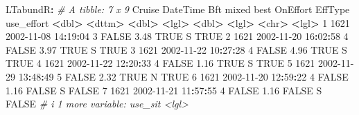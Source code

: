 \documentclass[
]{book}
\newenvironment{Shaded}{\begin{snugshade}}{\end{snugshade}}
\newcommand{\CommentTok}[1]{\textcolor[rgb]{0.56,0.35,0.01}{\textit{#1}}}
\newcommand{\ConstantTok}[1]{\textcolor[rgb]{0.56,0.35,0.01}{#1}}
\newcommand{\DecValTok}[1]{\textcolor[rgb]{0.00,0.00,0.81}{#1}}
\newcommand{\ErrorTok}[1]{\textcolor[rgb]{0.64,0.00,0.00}{\textbf{#1}}}
\newcommand{\FloatTok}[1]{\textcolor[rgb]{0.00,0.00,0.81}{#1}}
\newcommand{\NormalTok}[1]{#1}
\newcommand{\SpecialCharTok}[1]{\textcolor[rgb]{0.81,0.36,0.00}{\textbf{#1}}}
\begin{document}
\begin{Shaded}
\begin{Highlighting}[]
\NormalTok{LTabundR}\SpecialCharTok{:}
\CommentTok{\# A tibble: 7 x 9}
\NormalTok{  Cruise DateTime              Bft mixed  best OnEffort EffType use\_effort}
   \SpecialCharTok{\textless{}}\NormalTok{dbl}\SpecialCharTok{\textgreater{}} \ErrorTok{\textless{}}\NormalTok{dttm}\SpecialCharTok{\textgreater{}}              \ErrorTok{\textless{}}\NormalTok{dbl}\SpecialCharTok{\textgreater{}} \ErrorTok{\textless{}}\NormalTok{lgl}\SpecialCharTok{\textgreater{}} \ErrorTok{\textless{}}\NormalTok{dbl}\SpecialCharTok{\textgreater{}} \ErrorTok{\textless{}}\NormalTok{lgl}\SpecialCharTok{\textgreater{}}    \ErrorTok{\textless{}}\NormalTok{chr}\SpecialCharTok{\textgreater{}}   \ErrorTok{\textless{}}\NormalTok{lgl}\SpecialCharTok{\textgreater{}}     
\DecValTok{1}   \DecValTok{1621} \DecValTok{2002{-}11{-}08} \DecValTok{14}\SpecialCharTok{:}\DecValTok{19}\SpecialCharTok{:}\DecValTok{04}     \DecValTok{3} \ConstantTok{FALSE}  \FloatTok{3.48} \ConstantTok{TRUE}\NormalTok{     S       }\ConstantTok{TRUE}      
\DecValTok{2}   \DecValTok{1621} \DecValTok{2002{-}11{-}20} \DecValTok{16}\SpecialCharTok{:}\DecValTok{02}\SpecialCharTok{:}\DecValTok{58}     \DecValTok{4} \ConstantTok{FALSE}  \FloatTok{3.97} \ConstantTok{TRUE}\NormalTok{     S       }\ConstantTok{TRUE}      
\DecValTok{3}   \DecValTok{1621} \DecValTok{2002{-}11{-}22} \DecValTok{10}\SpecialCharTok{:}\DecValTok{27}\SpecialCharTok{:}\DecValTok{28}     \DecValTok{4} \ConstantTok{FALSE}  \FloatTok{4.96} \ConstantTok{TRUE}\NormalTok{     S       }\ConstantTok{TRUE}      
\DecValTok{4}   \DecValTok{1621} \DecValTok{2002{-}11{-}22} \DecValTok{12}\SpecialCharTok{:}\DecValTok{20}\SpecialCharTok{:}\DecValTok{33}     \DecValTok{4} \ConstantTok{FALSE}  \FloatTok{1.16} \ConstantTok{TRUE}\NormalTok{     S       }\ConstantTok{TRUE}      
\DecValTok{5}   \DecValTok{1621} \DecValTok{2002{-}11{-}29} \DecValTok{13}\SpecialCharTok{:}\DecValTok{48}\SpecialCharTok{:}\DecValTok{49}     \DecValTok{5} \ConstantTok{FALSE}  \FloatTok{2.32} \ConstantTok{TRUE}\NormalTok{     N       }\ConstantTok{TRUE}      
\DecValTok{6}   \DecValTok{1621} \DecValTok{2002{-}11{-}20} \DecValTok{12}\SpecialCharTok{:}\DecValTok{59}\SpecialCharTok{:}\DecValTok{22}     \DecValTok{4} \ConstantTok{FALSE}  \FloatTok{1.16} \ConstantTok{FALSE}\NormalTok{    S       }\ConstantTok{FALSE}     
\DecValTok{7}   \DecValTok{1621} \DecValTok{2002{-}11{-}21} \DecValTok{11}\SpecialCharTok{:}\DecValTok{57}\SpecialCharTok{:}\DecValTok{55}     \DecValTok{4} \ConstantTok{FALSE}  \FloatTok{1.16} \ConstantTok{FALSE}\NormalTok{    S       }\ConstantTok{FALSE}     
\CommentTok{\# i 1 more variable: use\_sit \textless{}lgl\textgreater{}}
\end{Highlighting}
\end{Shaded}
\end{document}
